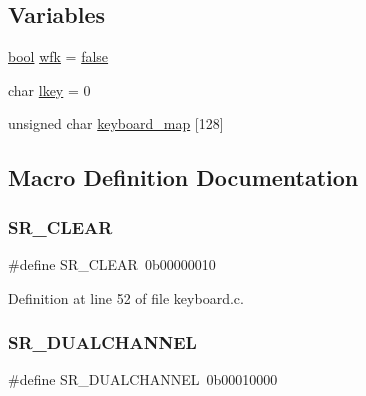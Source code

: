 \subsection*{Variables}
\begin{DoxyCompactItemize}
\item 
\hyperlink{a00134_af6a258d8f3ee5206d682d799316314b1_af6a258d8f3ee5206d682d799316314b1}{bool} \hyperlink{a00032_a6ddd5223379778858edc46ffbec19775_a6ddd5223379778858edc46ffbec19775}{wfk} = \hyperlink{a00134_af6a258d8f3ee5206d682d799316314b1_af6a258d8f3ee5206d682d799316314b1ae9de385ef6fe9bf3360d1038396b884c}{false}
\item 
char \hyperlink{a00032_ade374650022cb30c4f5591a8dafad685_ade374650022cb30c4f5591a8dafad685}{lkey} = 0
\item 
unsigned char \hyperlink{a00032_a5d0b5e007d1b57bf84d1c03439810533_a5d0b5e007d1b57bf84d1c03439810533}{keyboard\+\_\+map} \mbox{[}128\mbox{]}
\end{DoxyCompactItemize}


\subsection{Macro Definition Documentation}
\mbox{\label{a00032_a8aa66e8bc828742fb4819d7cd2df598d_a8aa66e8bc828742fb4819d7cd2df598d}} 
\subsubsection{\texorpdfstring{S\+R\+\_\+\+C\+L\+E\+AR}{SR\_CLEAR}}
{\footnotesize\ttfamily \#define S\+R\+\_\+\+C\+L\+E\+AR~0b00000010}



Definition at line 52 of file keyboard.\+c.

\mbox{\label{a00032_addafe32b109f94a57ae4bf1a1dca05e0_addafe32b109f94a57ae4bf1a1dca05e0}} 
\subsubsection{\texorpdfstring{S\+R\+\_\+\+D\+U\+A\+L\+C\+H\+A\+N\+N\+EL}{SR\_DUALCHANNEL}}
{\footnotesize\ttfamily \#define S\+R\+\_\+\+D\+U\+A\+L\+C\+H\+A\+N\+N\+EL~0b00010000}



